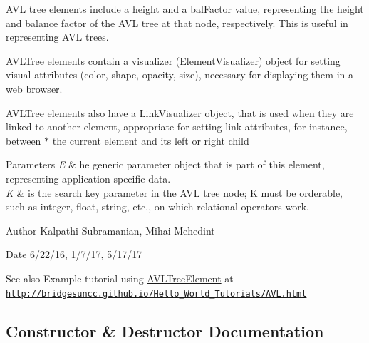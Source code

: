 A\+V\+L tree elements include a \textquotesingle{}height\textquotesingle{} and a \textquotesingle{}bal\+Factor\textquotesingle{} value, representing the height and balance factor of the A\+V\+L tree at that node, respectively. This is useful in representing A\+V\+L trees.

A\+V\+L\+Tree elements contain a visualizer (\hyperlink{classbridges_1_1base_1_1_element_visualizer}{Element\+Visualizer}) object for setting visual attributes (color, shape, opacity, size), necessary for displaying them in a web browser.

A\+V\+L\+Tree elements also have a \hyperlink{classbridges_1_1base_1_1_link_visualizer}{Link\+Visualizer} object, that is used when they are linked to another element, appropriate for setting link attributes, for instance, between $\ast$ the current element and its left or right child


\begin{DoxyParams}{Parameters}
{\em E} & he generic parameter object that is part of this element, representing application specific data. \\
\hline
{\em K} & is the search key parameter in the A\+V\+L tree node; K must be orderable, such as integer, float, string, etc., on which relational operators work.\\
\hline
\end{DoxyParams}
\begin{DoxyAuthor}{Author}
Kalpathi Subramanian, Mihai Mehedint
\end{DoxyAuthor}
\begin{DoxyDate}{Date}
6/22/16, 1/7/17, 5/17/17
\end{DoxyDate}
\begin{DoxySeeAlso}{See also}
Example tutorial using \hyperlink{classbridges_1_1base_1_1_a_v_l_tree_element}{A\+V\+L\+Tree\+Element} at ~\newline
 \href{http://bridgesuncc.github.io/Hello_World_Tutorials/AVL.html}{\tt http\+://bridgesuncc.\+github.\+io/\+Hello\+\_\+\+World\+\_\+\+Tutorials/\+A\+V\+L.\+html} 
\end{DoxySeeAlso}


\subsection{Constructor \& Destructor Documentation}
\hypertarget{classbridges_1_1base_1_1_a_v_l_tree_element_a8fe4490d3d5d16991736bd1a7243b904}{}
